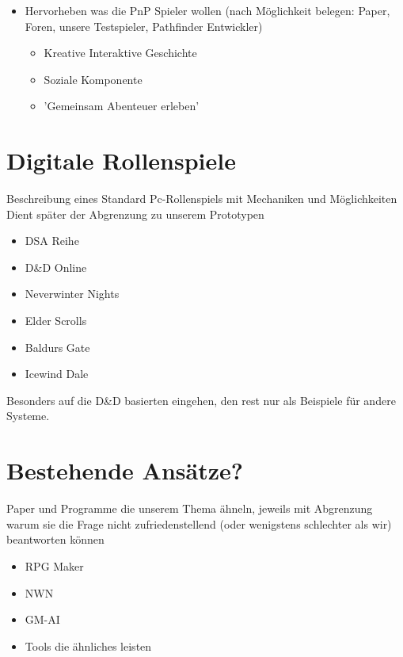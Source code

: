 \begin{itemize}
	\item Hervorheben was die PnP Spieler wollen (nach Möglichkeit belegen: Paper, Foren, unsere Testspieler, Pathfinder Entwickler)
	
	\begin{itemize}
		\item Kreative Interaktive Geschichte
		\item Soziale Komponente
		\item 'Gemeinsam Abenteuer erleben'
	\end{itemize}
\end{itemize}


\section{Digitale Rollenspiele}
\label{sec:DigitaleRollenspiele}

Beschreibung eines Standard Pc-Rollenspiels mit Mechaniken und Möglichkeiten\newline
Dient später der Abgrenzung zu unserem Prototypen
\begin{itemize}
	\item DSA Reihe
	\item D\&D Online
	\item Neverwinter Nights
	\item Elder Scrolls
	\item Baldurs Gate
	\item Icewind Dale
\end{itemize}
Besonders auf die D\&D basierten eingehen, den rest nur als Beispiele für andere Systeme.

\section{Bestehende Ansätze?}
\label{sec:BekannteAnsaetze}
Paper und Programme die unserem Thema ähneln, jeweils mit Abgrenzung warum sie die Frage nicht zufriedenstellend (oder wenigstens schlechter als wir) beantworten können
\begin{itemize}
	\item RPG Maker
	\item NWN
	\item GM-AI
	\item Tools die ähnliches leisten
\end{itemize}